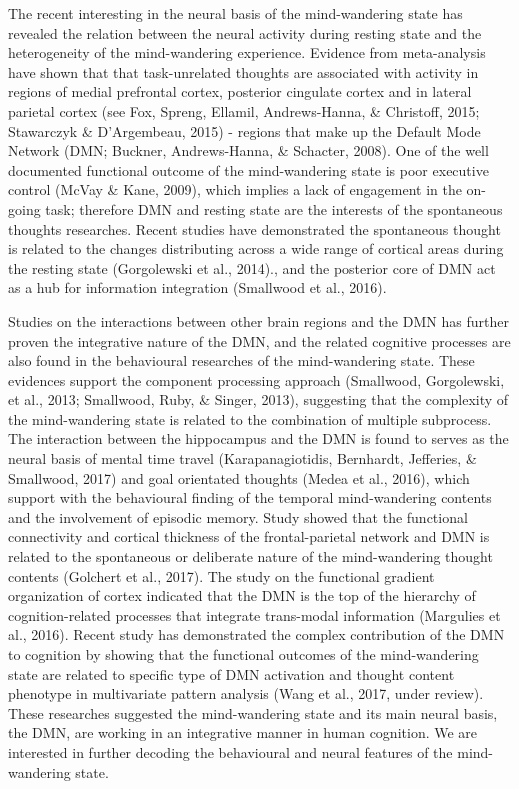 The recent interesting in the neural basis of the mind-wandering state has revealed the relation between the neural activity during resting state and the heterogeneity of the mind-wandering experience. Evidence from meta-analysis have shown that that task-unrelated thoughts are associated with activity in regions of medial prefrontal cortex, posterior cingulate cortex and in lateral parietal cortex (see Fox, Spreng, Ellamil, Andrews-Hanna, \& Christoff, 2015; Stawarczyk \& D’Argembeau, 2015) - regions that make up the Default Mode Network (DMN; Buckner, Andrews-Hanna, \& Schacter, 2008). One of the well documented functional outcome of the mind-wandering state is poor executive control (McVay \& Kane, 2009), which implies a lack of engagement in the on-going task; therefore DMN and resting state are the interests of the spontaneous thoughts researches. Recent studies have demonstrated the spontaneous thought is related to the changes distributing across a wide range of cortical areas during the resting state   (Gorgolewski et al., 2014)., and the posterior core of DMN act as a hub for information integration (Smallwood et al., 2016). 

Studies on the interactions between other brain regions and the DMN has further proven the integrative nature of the DMN, and the related cognitive processes are also found in the behavioural researches of the mind-wandering state. These evidences support the component processing approach (Smallwood, Gorgolewski, et al., 2013; Smallwood, Ruby, \& Singer, 2013), suggesting that the complexity of the mind-wandering state is related to the combination of multiple subprocess. The interaction between the hippocampus and the DMN is found to serves as the neural basis of mental time travel (Karapanagiotidis, Bernhardt, Jefferies, \& Smallwood, 2017) and goal orientated thoughts (Medea et al., 2016), which support with the behavioural finding of the temporal mind-wandering contents and the involvement of episodic memory.  Study showed that the functional connectivity and cortical thickness of the frontal-parietal network and DMN is related to the spontaneous or deliberate nature of the mind-wandering thought contents (Golchert et al., 2017). The study on the functional gradient organization of cortex indicated that the DMN is the top of the hierarchy of cognition-related processes that integrate trans-modal information (Margulies et al., 2016). Recent study has demonstrated the complex contribution of the DMN to cognition by showing that the functional outcomes of the mind-wandering state are related to specific type of DMN activation and thought content phenotype in multivariate pattern analysis (Wang et al., 2017, under review).  These researches suggested the mind-wandering state and its main neural basis, the DMN, are working in an integrative manner in human cognition. We are interested in further decoding the behavioural and neural features of the mind-wandering state. 
